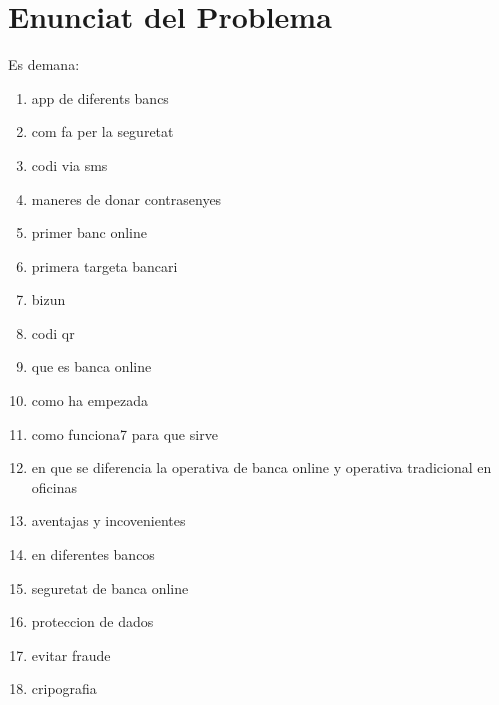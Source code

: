 \section{Enunciat del Problema}


\begin{center}
\end{center}

Es demana:
\begin{enumerate}
    \item app de diferents bancs
    \item com fa per la seguretat
    \item codi via sms
    \item maneres de donar contrasenyes
    \item primer banc online
    \item primera targeta bancari
    \item bizun
    \item codi qr
    \item que es banca online
    \item como  ha empezada
    \item como funciona7 para que sirve
    \item en que se diferencia la operativa de banca online y operativa tradicional en oficinas
    \item aventajas y incovenientes
    \item en diferentes bancos
    \item seguretat de banca online
    \item proteccion de dados
    \item evitar fraude
    \item cripografia
\end{enumerate}


